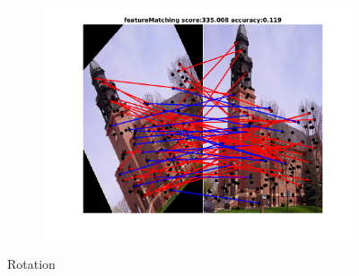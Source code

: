 \begin{figure}[h]
\begin{subfigure}[b]{0.33\textwidth}
	\end{subfigure} 
	\begin{subfigure}[b]{0.33\textwidth}
		\centering
		\includegraphics[scale=0.25]{"chapter3/fig/ImageTrafo/anchor_descr/using_cpd_afftrafo/fi_1_featureMatching"} 
	\end{subfigure} 	
	\caption{Rotation}
	

\end{figure}
